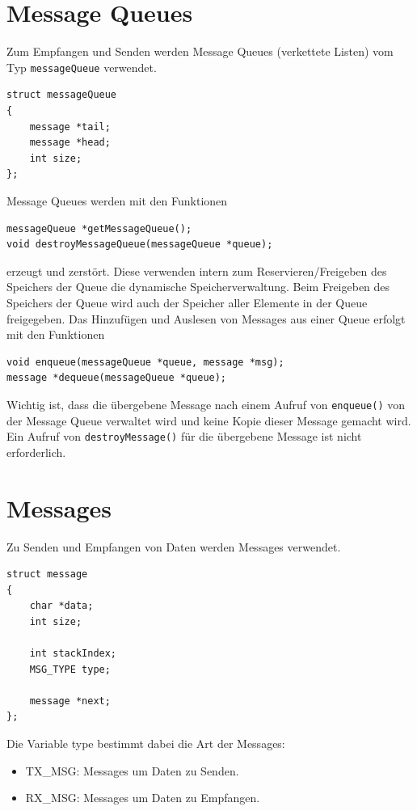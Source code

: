\documentclass[fontsize=12pt, toc=bibliography, notitlepage]{scrreprt}
\begin{document}
\section{Message Queues}
\label{subsec:shell-queue}
Zum Empfangen und Senden werden Message Queues (verkettete Listen) vom Typ \lstinline$messageQueue$ verwendet.

\begin{lstlisting}
struct messageQueue
{
	message *tail;
	message *head;
	int size;
};
\end{lstlisting}

Message Queues werden mit den Funktionen

\begin{lstlisting}
messageQueue *getMessageQueue();
void destroyMessageQueue(messageQueue *queue);
\end{lstlisting}

erzeugt und zerstört. Diese verwenden intern zum Reservieren/Freigeben des Speichers der Queue die dynamische Speicherverwaltung. Beim Freigeben des Speichers der Queue wird auch der Speicher aller Elemente in der Queue freigegeben. Das Hinzufügen und Auslesen von Messages aus einer Queue erfolgt mit den Funktionen

\begin{lstlisting}
void enqueue(messageQueue *queue, message *msg);
message *dequeue(messageQueue *queue);
\end{lstlisting}

Wichtig ist, dass die übergebene Message nach einem Aufruf von \lstinline$enqueue()$ von der Message Queue verwaltet wird und keine Kopie dieser Message gemacht wird.  Ein Aufruf von \lstinline$destroyMessage()$ für die übergebene Message ist nicht erforderlich.

\section{Messages}
\label{subsec:shell-messages}
Zu Senden und Empfangen von Daten werden Messages verwendet.

\begin{lstlisting}
struct message
{
	char *data;
	int size;

	int stackIndex;
	MSG_TYPE type;

	message *next;
};
\end{lstlisting}

Die Variable type bestimmt dabei die Art der Messages:
\begin{itemize}
	\item TX\_MSG: Messages um Daten zu Senden.
	\item RX\_MSG: Messages um Daten zu Empfangen.
\end{itemize}
\end{document}
